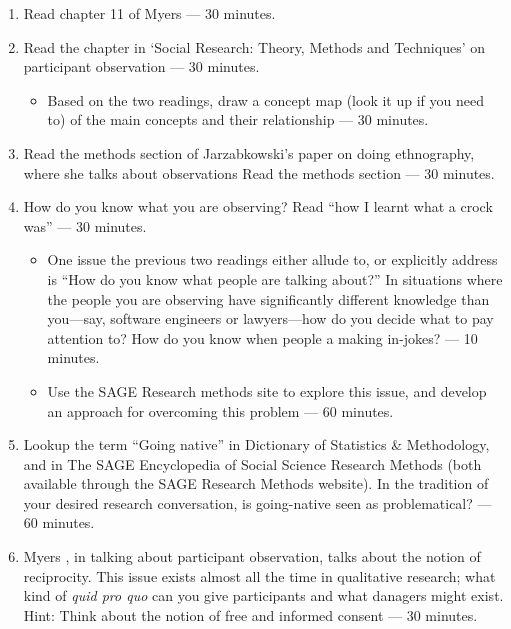 \documentclass[]{book}
\providecommand{\tightlist}{%
  \setlength{\itemsep}{0pt}\setlength{\parskip}{0pt}}
\theoremstyle{definition}
\theoremstyle{definition}
\theoremstyle{definition}
\theoremstyle{remark}
\begin{document}
\begin{enumerate}
\def\labelenumi{\arabic{enumi}.}
\item
  Read chapter 11 of Myers \autocite*[
  p.~136--150]{myers_2013_qualitativeresearchbusiness} --- 30 minutes.
\item
  Read the chapter in `Social Research: Theory, Methods and Techniques'
  on participant observation
  \autocite{corbetta_2003_socialresearchtheory} --- 30 minutes.

  \begin{itemize}
  \tightlist
  \item
    Based on the two readings, draw a concept map (look it up if you
    need to) of the main concepts and their relationship --- 30 minutes.
  \end{itemize}
\item
  Read the methods section of Jarzabkowski's paper on doing ethnography,
  where she talks about observations
  \autocite{jarzabkowski_2015_conductingglobalteambased} Read the
  methods section --- 30 minutes.
\item
  How do you know what you are observing? Read ``how I learnt what a
  crock was'' \autocite{becker_1993_howlearnedwhat} --- 30 minutes.

  \begin{itemize}
  \item
    One issue the previous two readings either allude to, or explicitly
    address is ``How do you know what people are talking about?'' In
    situations where the people you are observing have significantly
    different knowledge than you---say, software engineers or
    lawyers---how do you decide what to pay attention to? How do you
    know when people a making in-jokes? --- 10 minutes.
  \item
    Use the SAGE Research methods site to explore this issue, and
    develop an approach for overcoming this problem --- 60 minutes.
  \end{itemize}
\item
  Lookup the term ``Going native'' in Dictionary of Statistics \&
  Methodology, and in The SAGE Encyclopedia of Social Science Research
  Methods (both available through the SAGE Research Methods website). In
  the tradition of your desired research conversation, is going-native
  seen as problematical? --- 60 minutes.
\item
  Myers \autocite*{myers_2013_qualitativeresearchbusiness}, in talking
  about participant observation, talks about the notion of reciprocity.
  This issue exists almost all the time in qualitative research; what
  kind of \emph{quid pro quo} can you give participants and what
  danagers might exist. Hint: Think about the notion of free and
  informed consent
  \autocite{theuniversityofauckland_2013_guidingprinciplesconducting}
  --- 30 minutes.
\end{enumerate}
\end{document}
